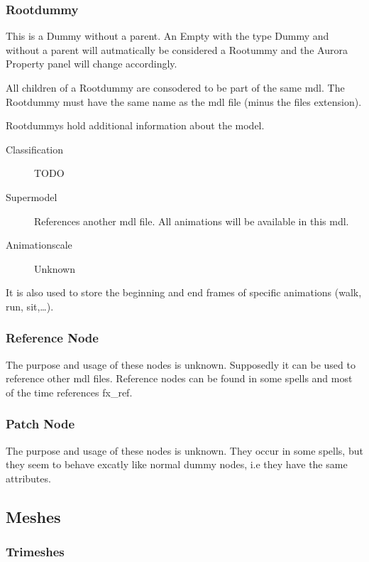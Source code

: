 \subsubsection{Rootdummy}
This is a Dummy without a parent. An Empty with the type Dummy and without
a parent will autmatically be considered a Rootummy and the Aurora Property
panel will change accordingly.

All children of a Rootdummy are consodered to be part of the same mdl. The
Rootdummy must have the same name as the mdl file
(minus the files extension).

Rootdummys hold additional information about the model.
\begin{description}
    \item[Classification] TODO
    \item[Supermodel] References another mdl file. All animations will be available in this mdl.
    \item[Animationscale] Unknown
\end{description}
It is also used to store the beginning and end frames of specific animations
(walk, run, sit,\ldots).

\subsubsection{Reference Node}
The purpose and usage of these nodes is unknown. Supposedly it can be used to
reference other mdl files. Reference nodes can be found in some spells and
most of the time references fx\_ref.

\subsubsection{Patch Node}
The purpose and usage of these nodes is unknown. They occur in some spells, but
they seem to behave excatly like normal dummy nodes, i.e they have the same
attributes.

\subsection{Meshes}

\subsubsection{Trimeshes}

